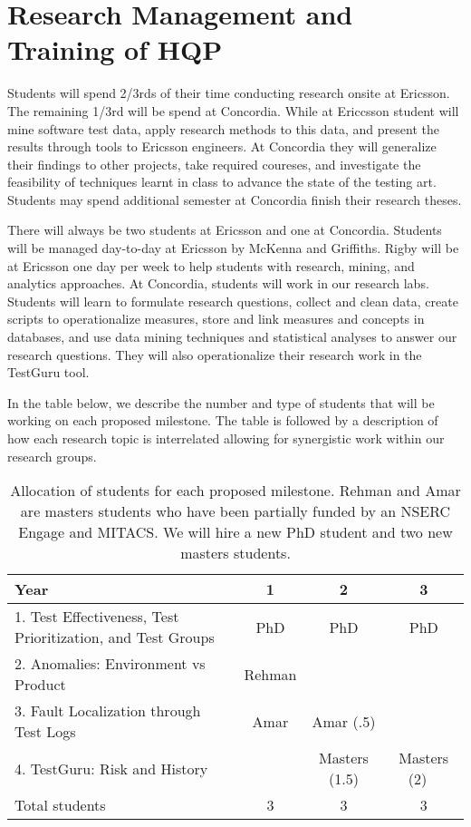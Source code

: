 \section*{Research Management and Training of HQP}

Students will spend 2/3rds of their time conducting research onsite at Ericsson. The remaining 1/3rd will be spend at Concordia. While at Ericcsson student will mine software test data, apply research methods to this data, and present the results through tools to Ericsson engineers. At Concordia they will generalize their findings to other projects, take required coureses, and investigate the feasibility of techniques learnt in class to advance the state of the testing art. Students may spend additional semester at Concordia finish their research theses.

There will always be two students at Ericsson and one at Concordia. Students will be managed day-to-day at Ericsson by McKenna and Griffiths. Rigby will be at Ericsson one day per week to help students with research, mining, and analytics approaches. At Concordia, students will work in our research labs.
%
Students will learn to formulate research questions, collect and clean data, create scripts to operationalize measures, store and link measures and concepts in databases, and use  data mining techniques and statistical analyses to answer our research questions. They will also operationalize their research work in the TestGuru tool.

In the table below, we describe the number and type of students that will be working on each proposed milestone. The table is followed by a description of how each research topic is interrelated allowing for synergistic work within our research groups.

\begin{table}[h]
\center
\caption{Allocation of students for each proposed milestone. Rehman and Amar are masters students who have been partially funded by an NSERC Engage and MITACS. We will hire a new PhD student and two new masters students.}
\label{tableHQP}
\vspace{+3mm}

\begin{tabular}{  l | c | c | c  }
\hline
	\textbf{Year} & 1 & 2 & 3 \\ \hline
	1. Test Effectiveness, Test Prioritization, and Test Groups & PhD & PhD & PhD \\ 
	2. Anomalies: Environment vs Product & Rehman &  & \  \\ 
	3. Fault Localization through Test Logs & Amar & Amar (.5) & \  \\ 
	4. TestGuru: Risk and History & & Masters (1.5) &  Masters (2)  \  \\ \hline
	Total students & 3 & 3 & 3 \\ \hline

\end{tabular}

\end{table}

